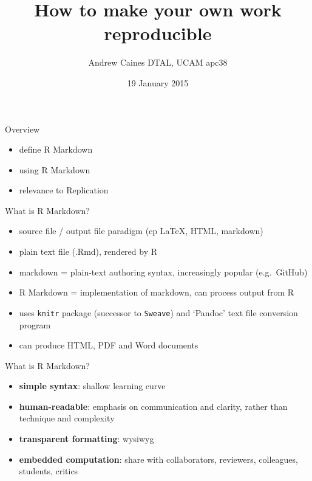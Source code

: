 \documentclass[ignorenonframetext,]{beamer}
\title{How to make your own work reproducible}
\author{Andrew Caines \textbar{} DTAL, UCAM \textbar{} apc38}
\date{19 January 2015}
\begin{document}
\frame{\titlepage}

\begin{frame}{Overview}

\begin{itemize}[<+->]
\itemsep1pt\parskip0pt
\item
  define R Markdown
\item
  using R Markdown
\item
  relevance to Replication
\end{itemize}

\end{frame}

\begin{frame}{What is R Markdown?}

\begin{itemize}[<+->]
\itemsep1pt\parskip0pt
\item
  source file / output file paradigm (cp LaTeX, HTML, markdown)
\item
  plain text file (.Rmd), rendered by R
\item
  markdown = plain-text authoring syntax, increasingly popular
  (e.g.~GitHub)
\item
  R Markdown = implementation of markdown, can process output from R
\item
  uses \texttt{knitr} package (successor to \texttt{Sweave}) and
  `Pandoc' text file conversion program
\item
  can produce HTML, PDF and Word documents
\end{itemize}

\end{frame}

\begin{frame}{What is R Markdown?}

\begin{itemize}[<+->]
\itemsep1pt\parskip0pt
\item
  \textbf{simple syntax}: shallow learning curve
\item
  \textbf{human-readable}: emphasis on communication and clarity, rather
  than technique and complexity
\item
  \textbf{transparent formatting}: wysiwyg
\item
  \textbf{embedded computation}: share with collaborators, reviewers,
  colleagues, students, critics
\end{itemize}

\end{frame}
\end{document}
